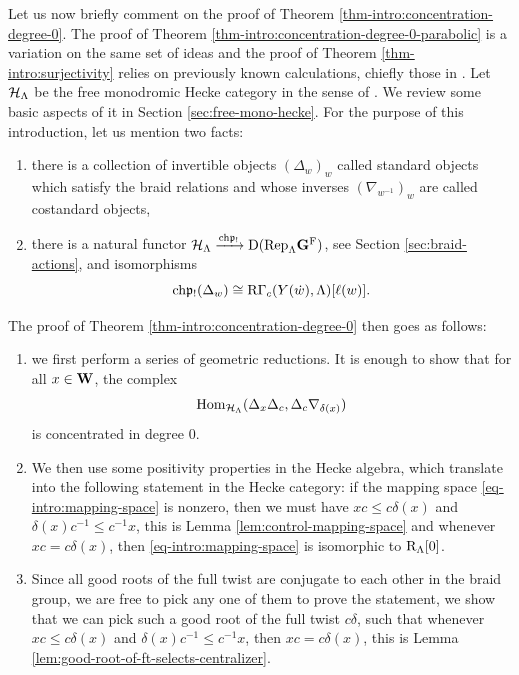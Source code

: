\documentclass[article, 10pt, oneside, reqno]{amsart}
\theoremstyle{plain}
\theoremstyle{definition}
\theoremstyle{remark}
\begin{document}
Let us now briefly comment on the proof of Theorem \ref{thm-intro:concentration-degree-0}. The proof of Theorem \ref{thm-intro:concentration-degree-0-parabolic} is a variation on the same set of ideas and the proof of Theorem \ref{thm-intro:surjectivity} relies on previously known calculations, chiefly those in \cite{DigneMichelRouquier}. Let $\mathcal{H}_{\Lambda}$ be the free monodromic Hecke category in the sense of \cite{BezrukavnikovYun, BezrukavnikovRicheSoergelTheory,Gouttard, EteveFreeMono}. We review some basic aspects of it in Section \ref{sec:free-mono-hecke}. For the purpose of this introduction, let us mention two facts: 
\begin{enumerate}
\item there is a collection of invertible objects $(\Delta_w)_w$ called standard objects which satisfy the braid relations and whose inverses $(\nabla_{w^{-1}})_{w}$ are called costandard objects, 
\item there is a natural functor $\mathcal{H}_{\Lambda} \xrightarrow{\mathrm{ch}\mathfrak{p}_!} \mathrm{D}(\mathrm{Rep}_{\Lambda}\mathbf{G}^{\mathrm{F}})$, see Section \ref{sec:braid-actions}, and isomorphisms
$$\mathrm{ch}\mathfrak{p}_!(\Delta_w) \cong \mathrm{R\Gamma}_c(Y(\dot{w}), \Lambda)[\ell(w)].$$
\end{enumerate}

The proof of Theorem \ref{thm-intro:concentration-degree-0} then goes as follows: 
\begin{enumerate}
\item we first perform a series of geometric reductions. It is enough to show that for all $x \in \mathbf{W}$, the complex 
\begin{equation}\label{eq-intro:mapping-space}
\mathrm{Hom}_{\mathcal{H}_{\Lambda}}(\Delta_x\Delta_c, \Delta_c\nabla_{\delta(x)})
\end{equation}
is concentrated in degree $0$.
\item We then use some positivity properties in the Hecke algebra, which translate into the following statement in the Hecke category: if the mapping space \eqref{eq-intro:mapping-space} is nonzero, then we must have $xc \leq c\delta(x)$ and $\delta(x)c^{-1} \leq c^{-1}x$, this is Lemma \ref{lem:control-mapping-space} and whenever $xc = c\delta(x)$, then \eqref{eq-intro:mapping-space} is isomorphic to $\mathrm{R}_{\Lambda}[0]$.
\item Since all good roots of the full twist are conjugate to each other in the braid group, we are free to pick any one of them to prove the statement, we show that we can pick such a good root of the full twist $c\delta$, such that whenever $xc \leq c\delta(x)$ and $\delta(x)c^{-1} \leq c^{-1}x$, then $xc = c\delta(x)$, this is Lemma \ref{lem:good-root-of-ft-selects-centralizer}.
\end{enumerate}
\end{document}
